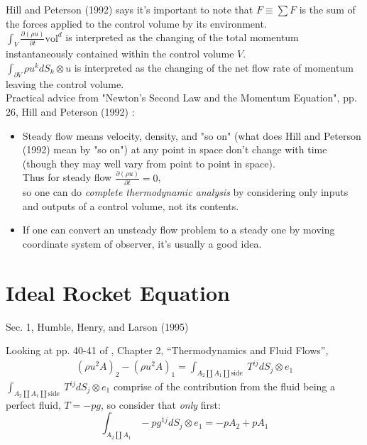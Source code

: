 \documentclass[10pt]{amsart}
\begin{document}
\begin{multicols*}{2}
Hill and Peterson (1992) \cite{HiPe1992} says it's important to note that  $F \equiv \sum F$ is the sum of the forces applied to the control volume by its environment. \\

$\int_V \frac{ \partial (\rho u) }{ \partial t} \text{vol}^d$ is interpreted as the changing of the total momentum instantaneously contained within the control volume $V$. \\

$\int_{\partial V} \rho u^k dS_k \otimes u$ is interpreted as the changing of the net flow rate of momentum leaving the control volume. \\

Practical advice from "Newton's Second Law and the Momentum Equation", pp. 26, Hill and Peterson (1992) \cite{HiPe1992}:

\begin{itemize}
	\item Steady flow means velocity, density, and "so on" (what does Hill and Peterson (1992) \cite{HiPe1992} mean by "so on") at any point in space don't change with time (though they may well vary from point to point in space). \\
	Thus for steady flow $\frac{ \partial ( \rho u ) }{ \partial t } = 0$, \\
	so one can do \emph{complete thermodynamic analysis} by considering only inputs and outputs of a control volume, not its contents.
	\item If one can convert an unsteady flow problem to a steady one by moving coordinate system of observer, it's usually a good idea. 
\end{itemize}






\section{Ideal Rocket Equation}

Sec. 1, Humble, Henry, and Larson (1995)

Looking at pp. 40-41 of \cite{GOates1997}, Chapter 2, ``Thermodynamics and Fluid Flows'', 
\[
\begin{gathered}
  (\rho u^2 A)_2 - (\rho u^2 A)_1 = \int_{ A_2 \coprod A_1 \coprod \text{side }} T^{ij} dS_j \otimes e_1
\end{gathered}
\]
$\int_{ A_2 \coprod A_1 \coprod \text{side }} T^{ij} dS_j \otimes e_1$ comprise of the contribution from the fluid being a perfect fluid, $T=-pg$, so consider that \emph{only} first:
\[
\int_{A_2 \coprod A_1} - p g^{1j} dS_j\otimes e_1 = -pA_2 + pA_1
\]



\end{multicols*}
\end{document}

